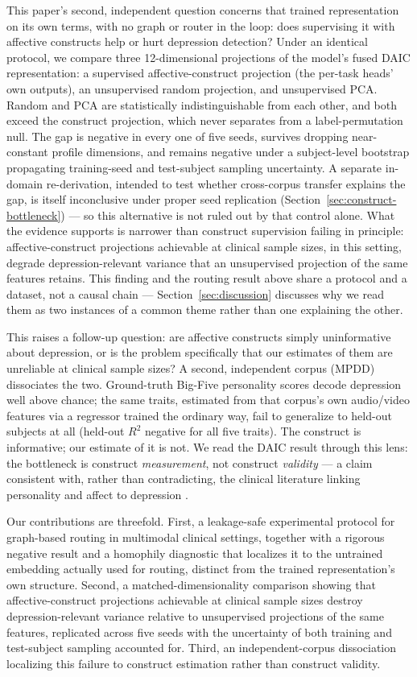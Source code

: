 \documentclass[letterpaper]{article}
\begin{document}
This paper's second, independent question concerns that trained representation on its own terms, with no graph or router in the loop: does supervising it with affective constructs help or hurt depression detection? Under an identical protocol, we compare three 12-dimensional projections of the model's fused DAIC representation: a supervised affective-construct projection (the per-task heads' own outputs), an unsupervised random projection, and unsupervised PCA. Random and PCA are statistically indistinguishable from each other, and both exceed the construct projection, which never separates from a label-permutation null. The gap is negative in every one of five seeds, survives dropping near-constant profile dimensions, and remains negative under a subject-level bootstrap propagating training-seed and test-subject sampling uncertainty. A separate in-domain re-derivation, intended to test whether cross-corpus transfer explains the gap, is itself inconclusive under proper seed replication (Section~\ref{sec:construct-bottleneck}) — so this alternative is not ruled out by that control alone. What the evidence supports is narrower than construct supervision failing in principle: affective-construct projections achievable at clinical sample sizes, in this setting, degrade depression-relevant variance that an unsupervised projection of the same features retains. This finding and the routing result above share a protocol and a dataset, not a causal chain — Section~\ref{sec:discussion} discusses why we read them as two instances of a common theme rather than one explaining the other.

This raises a follow-up question: are affective constructs simply uninformative about depression, or is the problem specifically that our estimates of them are unreliable at clinical sample sizes? A second, independent corpus (MPDD) dissociates the two. Ground-truth Big-Five personality scores decode depression well above chance; the same traits, estimated from that corpus's own audio/video features via a regressor trained the ordinary way, fail to generalize to held-out subjects at all (held-out $R^2$ negative for all five traits). The construct is informative; our estimate of it is not. We read the DAIC result through this lens: the bottleneck is construct \emph{measurement}, not construct \emph{validity} — a claim consistent with, rather than contradicting, the clinical literature linking personality and affect to depression \citep{kotov2010linking,clark1991tripartite}.

Our contributions are threefold. First, a leakage-safe experimental protocol for graph-based routing in multimodal clinical settings, together with a rigorous negative result and a homophily diagnostic that localizes it to the untrained embedding actually used for routing, distinct from the trained representation's own structure. Second, a matched-dimensionality comparison showing that affective-construct projections achievable at clinical sample sizes destroy depression-relevant variance relative to unsupervised projections of the same features, replicated across five seeds with the uncertainty of both training and test-subject sampling accounted for. Third, an independent-corpus dissociation localizing this failure to construct estimation rather than construct validity.
\end{document}

